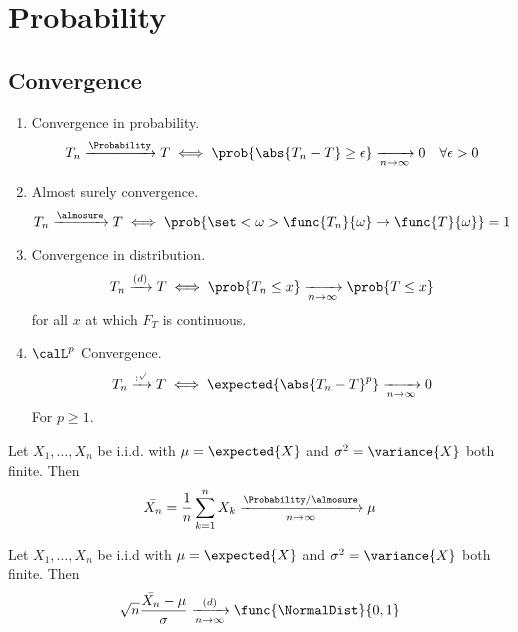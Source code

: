 \chapter{Probability}
\section{Convergence}
\begin{enumerate}
    \item Convergence in probability.
    \begin{equation*}
        T_n \xrightarrow{\Probability} T \iff \prob{\abs{T_n - T} \geq \epsilon} \xrightarrow[n \to \infty]{} 0 \quad \forall \epsilon > 0
    \end{equation*}
    \item Almost surely convergence.
    \begin{equation*}
        T_n \xrightarrow{\almosure} T \iff \prob{\set<\omega>{\func{T_n}{\omega} \to \func{T}{\omega}}} = 1
    \end{equation*}
    \item Convergence in distribution.
    \begin{equation*}
        T_n \xrightarrow{(d)} T \iff \prob{T_n \leq x} \xrightarrow[n \to \infty]{} \prob{T \leq x}
    \end{equation*}
    for all \(x\) at which \(F_T\) is continuous.
    \item \(\calL^p\) Convergence.
    \begin{equation}
        T_n \xrightarrow{\cal:^p} T \iff \expected{\abs{T_n - T}^p} \xrightarrow[n \to \infty]{} 0 
    \end{equation}
    For \(p \geq 1\).
\end{enumerate}

\begin{theorem}
    Let \(X_1, \dots , X_n\) be i.i.d. with \(\mu = \expected{X}\) and \(\sigma^2 = \variance{X}\) both finite. Then 
    \begin{equation*}
        \bar{X_n} = \dfrac{1}{n} \sum_{k = 1}^n X_k \xrightarrow[n \to \infty]{\Probability/\almosure} \mu
    \end{equation*}
\end{theorem}

\begin{theorem}
    Let \(X_1, \dots , X_n\) be i.i.d with \(\mu = \expected{X}\) and \(\sigma^2 = \variance{X}\) both finite. Then 
    \begin{equation*}
        \sqrt{n} \dfrac{\bar{X_n} - \mu}{\sigma} \xrightarrow[n \to \infty]{(d)} \func{\NormalDist}{0,1}
    \end{equation*}
\end{theorem}

